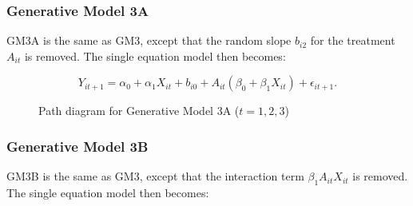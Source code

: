 \documentclass[
  12pt,
  a4paper,
]{article}
\begin{document}
\subsubsection{Generative Model 3A}\label{generative-model-3a}

GM3A is the same as GM3, except that the random slope \(b_{i2}\) for the
treatment \(A_{it}\) is removed. The single equation model then becomes:

\[
Y_{it+1} = \alpha_0 + \alpha_1 X_{it} + b_{i0} + A_{it} (\beta_0 + \beta_1 X_{it}) + \epsilon_{it+1}.
\]

\begin{figure}[H]

\caption{\label{fig-GM3A_path}Path diagram for Generative Model 3A
(\(t = 1, 2, 3\))}


\end{figure}%

\subsubsection{Generative Model 3B}\label{generative-model-3b}

GM3B is the same as GM3, except that the interaction term
\(\beta_1 A_{it} X_{it}\) is removed. The single equation model then
becomes:
\end{document}
